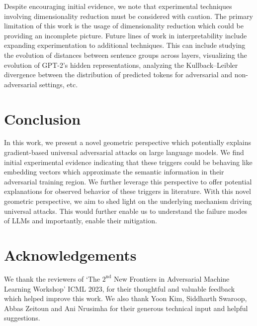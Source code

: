 \documentclass{article}
\theoremstyle{plain}
\theoremstyle{definition}
\theoremstyle{remark}
\begin{document}
Despite encouraging initial evidence, we note that experimental techniques involving dimensionality reduction must be considered with caution. The primary limitation of this work is the usage of dimensionality reduction which could be providing an incomplete picture. Future lines of work in interpretability include expanding experimentation to additional techniques. This can include studying the evolution of distances between sentence groups across layers, visualizing the evolution of GPT-2's hidden representations, analyzing the Kullback–Leibler divergence between the distribution of predicted tokens for adversarial and non-adversarial settings, etc.


\section{Conclusion}
In this work, we present a novel geometric perspective which potentially explains gradient-based universal adversarial attacks on large language models. We find initial experimental evidence indicating that these triggers could be behaving like embedding vectors which approximate the semantic information in their adversarial training region. We further leverage this perspective to offer potential explanations for observed behavior of these triggers in literature. With this novel geometric perspective, we aim to shed light on the underlying mechanism driving universal attacks. This would further enable us to understand the failure modes of LLMs and importantly, enable their mitigation.



\section*{Acknowledgements}
We thank the reviewers of `The $2^{\text{nd}}$ New Frontiers in Adversarial Machine Learning Workshop' ICML 2023, for their thoughtful and valuable feedback which helped improve this work. We also thank Yoon Kim, Siddharth Swaroop, Abbas Zeitoun and Ani Nrusimha for their generous technical input and helpful suggestions. 


\nocite{langley00}





\newpage
\appendix
\onecolumn
\end{document}
